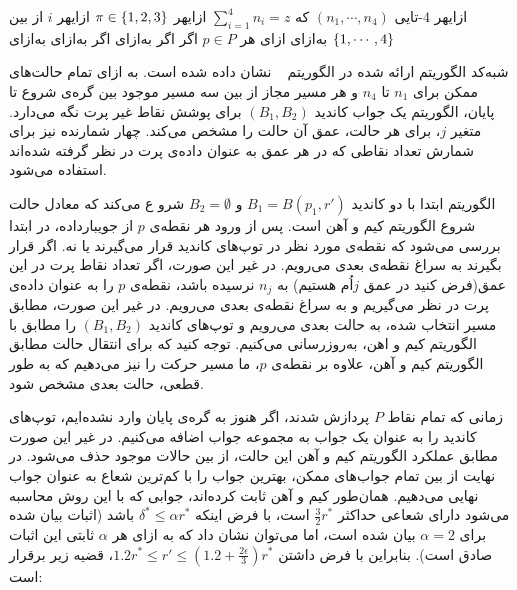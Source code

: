 ‌ازای{هر $4$-تایی $(n_1, \cdots, n_4)$ که $\sum_{i=1}^4 n_i = z$}
‌ازای{هر $\pi \in \left\{ 1, 2, 3 \right\}$}
‌ازای{هر $i$ از بین $\left\{ 1, \cdots, 4 \right\}$}
‌به‌ازای{}
‌ازای{ هر $p \in P$}
‌اگر{}
‌اگر{}
‌به‌ازای{}
‌اگر{}
‌به‌ازای{}
‌به‌ازای{}

شبه‌کد الگوریتم ارائه شده در الگوریتم ~ نشان داده شده است. به ازای تمام حالت‌های ممکن برای $n_1$ تا $n_4$ و هر مسیر مجاز از‌ بین سه مسیر موجود بین گره‌ی شروع تا پایان، الگوریتم یک جواب کاندید $(B_1, B_2)$ برای پوشش نقاط غیر پرت نگه می‌دارد. متغیر $j$، برای هر حالت، عمق آن حالت را مشخص می‌کند. چهار شمارنده نیز برای شمارش تعداد نقاطی که در هر عمق به عنوان داده‌ی پرت در نظر گرفته شده‌اند استفاده می‌شود.

الگوریتم ابتدا با دو کاندید $B_1 = B(p_1, r')$ و $B_2 = \emptyset$ شرو ع می‌کند که معادل حالت شروع الگوریتم کیم و آهن است. پس از ورود هر نقطه‌ی $p$ از جویبارداده، در ابتدا بررسی می‌شود که نقطه‌ی مورد نظر در توپ‌های کاندید قرار می‌گیرند یا نه. اگر قرار بگیرند به سراغ نقطه‌ی بعدی می‌رویم. در غیر این صورت، اگر تعداد نقاط پرت در این عمق‌(فرض کنید در عمق $j$اُم هستیم) به $n_j$ نرسیده باشد، نقطه‌ی $p$ را به عنوان داده‌ی پرت در نظر می‌گیریم و به سراغ نقطه‌ی بعدی می‌رویم. در غیر این صورت، مطابق مسیر انتخاب شده، به حالت بعدی می‌رویم و توپ‌های کاندید $(B_1, B_2)$ را مطابق با الگوریتم کیم و اهن، به‌روزرسانی می‌کنیم. توجه کنید که برای انتقال حالت مطابق الگوریتم کیم و آهن، علاوه بر نقطه‌ی $p$، ما مسیر حرکت را نیز‌ می‌دهیم که به طور قطعی، حالت بعدی مشخص شود.

زمانی که تمام نقاط $P$ پردازش شدند، اگر هنوز به گره‌ی پایان وارد نشده‌ایم، توپ‌های کاندید را به عنوان یک جواب به مجموعه جواب اضافه می‌کنیم. در غیر این صورت مطابق عملکرد الگوریتم کیم و آهن این حالت، از بین حالات موجود حذف می‌شود. در نهایت از بین تمام جواب‌های ممکن، بهترین جواب را با کم‌ترین شعاع به عنوان جواب نهایی می‌دهیم. همان‌طور کیم و آهن  ثابت کرده‌اند، جوابی که با این روش محاسبه می‌شود دارای شعاعی حداکثر $\frac{3}{2}r^*$ است، با فرض اینکه $\delta^* \leq \alpha r^*$ باشد (اثبات بیان شده برای $\alpha = 2$ بیان شده است، اما می‌توان نشان داد که به ازای هر $\alpha$ ثابتی این اثبات صادق است). بنابراین با فرض داشتن $1.2r^* \leq r' \leq (1.2 + \frac{2\epsilon}{3})r^*$، قضیه زیر برقرار است:

